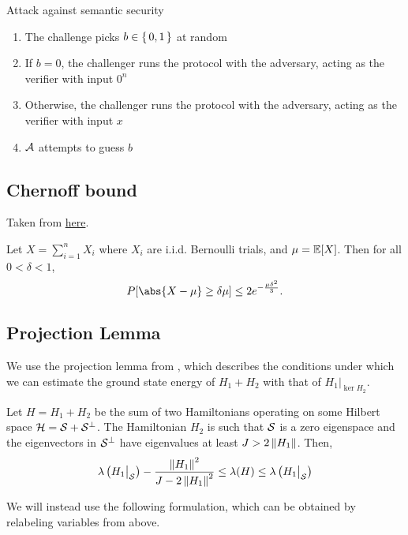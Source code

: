 \begin{protocol}{Attack against semantic security}
	\label{proto:indcpa}
	\begin{enumerate}
		\item The challenge picks $b\in\set{0,1}$ at random
		\item If $b=0$, the challenger runs the protocol with the adversary, acting as the verifier with input $0^n$
		\item Otherwise, the challenger runs the protocol with the adversary, acting as the verifier with input $x$
		\item $\mathcal{A}$ attempts to guess $b$
	\end{enumerate}
\end{protocol}

\subsection{Chernoff bound}

Taken from \href{http://math.mit.edu/~goemans/18310S15/chernoff-notes.pdf}{here}.

\begin{thm}
\label{thm:Chernoff}
Let $X=\sum_{i=1}^n X_i$ where $X_i$ are i.i.d.  Bernoulli trials, and $\mu=\operatorname*{\mathbb{E}}[X]$.
Then for all $0<\delta<1$,
$$P[\abs{X-\mu}\geq\delta\mu]\leq2e^{-\frac{\mu\delta^2}{3}}.$$
\end{thm}

\subsection{Projection Lemma}

We use the projection lemma from \cite{kempe_kitaev_regev_2006}, which describes the conditions under which we can estimate the ground state energy of $H_1 + H_2$ with that of $H_1\big|_{\ker H_2}$.

\begin{thm}
	Let $H=H_1+H_2$ be the sum of two Hamiltonians operating on some Hilbert space $\mathcal{H}=\mathcal{S}+\mathcal{S}^\bot$.
	The Hamiltonian $H_2$ is such that $\mathcal{S}$ is a zero eigenspace and the eigenvectors in $\mathcal{S}^\bot$ have eigenvalues at least $J>2\left\lVert H_1\right\rVert$. Then,
	$$\lambda\left(H_1\big|_{\mathcal{S}}\right)-\frac{\left\lVert H_1\right\rVert^2}{J-2\left\lVert H_1\right\rVert^2}\leq\lambda(H)\leq\lambda\left(H_1\big|_{\mathcal{S}}\right)$$
\end{thm}

We will instead use the following formulation, which can be obtained by relabeling variables from above.

